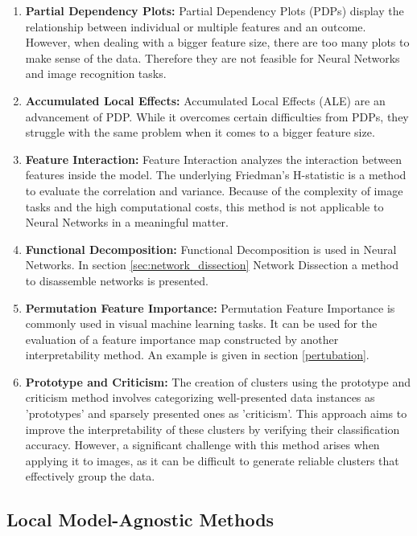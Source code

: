\begin{enumerate}
	\item \textbf{Partial Dependency Plots:} Partial Dependency Plots (PDPs)\cite{PDP} display the relationship between individual or multiple features and an outcome. However, when dealing with a bigger feature size, there are too many plots to make sense of the data. Therefore they are not feasible for Neural Networks and image recognition tasks.
	\item \textbf{Accumulated Local Effects:} Accumulated Local Effects (ALE)\cite{apley2019visualizing} are an advancement of PDP. While it overcomes certain difficulties from PDPs, they struggle with the same problem when it comes to a bigger feature size.
	\item \textbf{Feature Interaction:} Feature Interaction analyzes the interaction between features inside the model. The underlying Friedman's H-statistic\cite{friedman2008predictive} is a method to evaluate the correlation and variance. Because of the complexity of image tasks and the high computational costs, this method is not applicable to Neural Networks in a meaningful matter.
	\item \textbf{Functional Decomposition:} Functional Decomposition is used in Neural Networks. In section \ref{sec:network_dissection} Network Dissection a method to disassemble networks is presented.
	\item \textbf{Permutation Feature Importance:} Permutation Feature Importance is commonly used in visual machine learning tasks. It can be used for the evaluation of a feature importance map constructed by another interpretability method. An example is given in section \ref{pertubation}.
	\item \textbf{Prototype and Criticism:} The creation of clusters using the prototype and criticism method involves categorizing well-presented data instances as 'prototypes' and sparsely presented ones as 'criticism'. This approach aims to improve the interpretability of these clusters by verifying their classification accuracy. However, a significant challenge with this method arises when applying it to images, as it can be difficult to generate reliable clusters that effectively group the data.
\end{enumerate}


\subsection{Local Model-Agnostic Methods}

